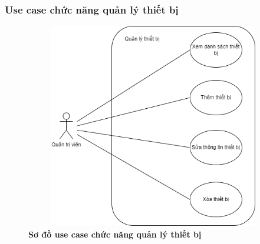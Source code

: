 \subsubsection{Use case chức năng quản lý thiết bị}
  \begin{figure}[H]
    \centering
    \includegraphics[width=14.2cm,height=9cm]{Images/use_case/use_case_manage_device.png}
    \caption[Sơ đồ use case chức năng quản lý thiết bị]{\bfseries \fontsize{12pt}{0pt}
    \selectfont Sơ đồ use case chức năng quản lý thiết bị}
    \label{use_case_device_management} %
  \end{figure}


